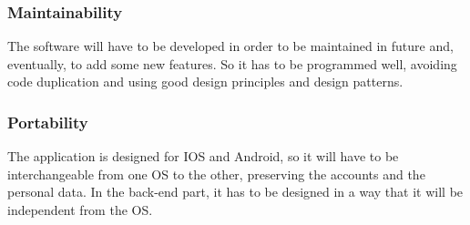 \documentclass[titlepage]{article}
\begin{document}
\subsubsection{Maintainability}
The software will have to be developed in order to be maintained in future and, eventually, to add some new features.
So it has to be programmed well, avoiding code duplication and using good design principles and design patterns.

\subsubsection{Portability}

The application is designed for IOS and Android, so it will have to be interchangeable from one OS to the other, preserving the accounts and the personal data.
In the back-end part, it has to be designed in a way that it will be independent from the OS.
\end{document}
